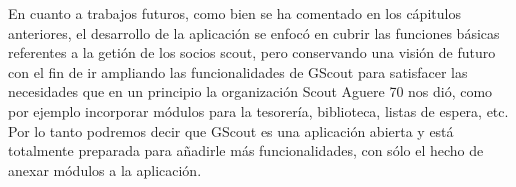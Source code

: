 En cuanto a trabajos futuros, como bien se ha comentado en los cápitulos anteriores, el desarrollo de la aplicación se enfocó en cubrir las funciones básicas
referentes a la getión de los socios scout, pero conservando una visión de futuro con el fin de ir ampliando las funcionalidades de GScout
para satisfacer las necesidades que en un principio la organización Scout Aguere 70 nos dió, como por ejemplo incorporar módulos para la tesorería, biblioteca, listas de espera, etc.\\

Por lo tanto podremos decir que GScout es una aplicación abierta y está totalmente preparada para añadirle más funcionalidades, con sólo el hecho de anexar
módulos a la aplicación.
